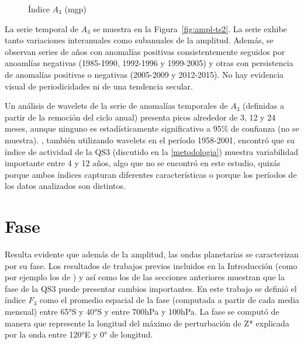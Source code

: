 \documentclass[spanish,a4paper,12pt,oneside]{book}
\begin{document}
\begin{figure}
\newline{}\caption{Índice $A_3$ (mgp)}\label{fig:ampl-ts}
\end{figure}

La serie temporal de \(A_3\) se muestra en la Figura~\ref{fig:ampl-ts2}.
La serie exhibe tanto variaciones interanuales como subanuales de la
amplitud. Además, se observan series de años con anomalías positivas
consistentemente seguidos por anoamlías negativas (1985-1990, 1992-1996
y 1999-2005) y otras con persistencia de anomalías positivas o negativas
(2005-2009 y 2012-2015). No hay evidencia visual de periodicidades ni de
una tendencia secular.

Un análisis de wavelets de la serie de anomalías temporales de \(A_3\)
(definidas a partir de la remoción del ciclo anual) presenta picos
alrededor de 3, 12 y 24 meses, aunque ninguno es estadísticamente
significativo a 95\% de confianza (no se muestra).
\textcite{Raphael2004}, también utilizando wavelets en el período
1958-2001, encontró que su índice de actividad de la QS3 (discutido en
la \autoref{metodologia}) muestra variabilidad importante entre 4 y 12
años, algo que no se encontró en este estudio, quizás porque ambos
índices capturan diferentes características o porque los períodos de los
datos analizados son distintos.

\section{Fase}\label{fase}

Resulta evidente que además de la amplitud, las ondas planetarias se
caracterizan por su fase. Los resultados de trabajos previos incluidos
en la Introducción (como por ejemplo los de \textcite{Trenberth1985}) y
así como los de las secciones anteriores muestran que la fase de la QS3
puede presentar cambios importantes. En este trabajo se definió el
índice \(F_3\) como el promedio espacial de la fase (computada a partir
de cada media mensual) entre 65°S y 40°S y entre 700hPa y 100hPa. La
fase se computó de manera que represente la longitud del máximo de
perturbación de Z* explicada por la onda entre 120°E y 0° de longitud.
\end{document}
